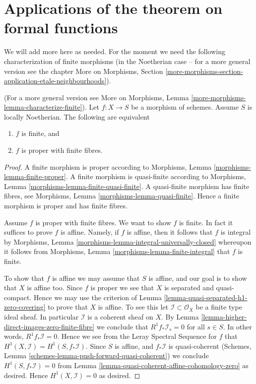 \section{Applications of the theorem on formal functions}
\label{section-applications-formal-functions}


\noindent
We will add more here as needed. For the moment we need the
following characterization of finite morphisms (in the Noetherian
case -- for a more general version see the chapter More on Morphisms,
Section \ref{more-morphisms-section-application-etale-neighbourhoods}).

\begin{lemma}
\label{lemma-characterize-finite}
(For a more general version see
More on Morphisms, Lemma \ref{more-morphisms-lemma-characterize-finite}).
Let $f : X \to S$ be a morphism of schemes.
Assume $S$ is locally Noetherian.
The following are equivalent
\begin{enumerate}
\item $f$ is finite, and
\item $f$ is proper with finite fibres.
\end{enumerate}
\end{lemma}

\begin{proof}
A finite morphism is proper according to
Morphisms, Lemma \ref{morphisms-lemma-finite-proper}.
A finite morphism is quasi-finite according to
Morphisms, Lemma \ref{morphisms-lemma-finite-quasi-finite}.
A quasi-finite morphism has finite fibres, see
Morphisms, Lemma \ref{morphisms-lemma-quasi-finite}.
Hence a finite morphism is proper and has finite fibres.

\medskip\noindent
Assume $f$ is proper with finite fibres.
We want to show $f$ is finite.
In fact it suffices to prove $f$ is affine.
Namely, if $f$ is affine, then it follows that
$f$ is integral by
Morphisms, Lemma \ref{morphisms-lemma-integral-universally-closed}
whereupon it follows from
Morphisms, Lemma \ref{morphisms-lemma-finite-integral}
that $f$ is finite.

\medskip\noindent
To show that $f$ is affine we may assume that $S$ is affine, and our
goal is to show that $X$ is affine too.
Since $f$ is proper we see that $X$ is separated and quasi-compact.
Hence we may use the criterion of
Lemma \ref{lemma-quasi-separated-h1-zero-covering} to prove that $X$
is affine. To see this let $\mathcal{I} \subset \mathcal{O}_X$
be a finite type ideal sheaf. In particular $\mathcal{I}$ is
a coherent sheaf on $X$. By
Lemma \ref{lemma-higher-direct-images-zero-finite-fibre} we conclude that
$R^1f_*\mathcal{I}_s = 0$ for all $s \in S$.
In other words, $R^1f_*\mathcal{I} = 0$. Hence we see from
the Leray Spectral Sequence for $f$ that
$H^1(X , \mathcal{I}) = H^1(S, f_*\mathcal{I})$.
Since $S$ is affine, and $f_*\mathcal{I}$ is quasi-coherent
(Schemes, Lemma \ref{schemes-lemma-push-forward-quasi-coherent})
we conclude $H^1(S, f_*\mathcal{I}) = 0$
from Lemma \ref{lemma-quasi-coherent-affine-cohomology-zero}
as desired. Hence $H^1(X, \mathcal{I}) = 0$ as desired.
\end{proof}

